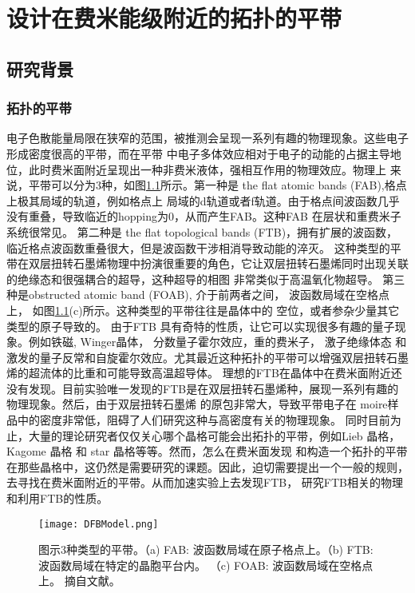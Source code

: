 \chapter{设计在费米能级附近的拓扑的平带}

\section{研究背景}

\subsection{拓扑的平带}
电子色散能量局限在狭窄的范围，被推测会呈现一系列有趣的物理现象。这些电子形成密度很高的平带，而在平带
中电子多体效应相对于电子的动能的占据主导地位，此时费米面附近呈现出一种非费米液体，强相互作用的物理效应。物理上
来说，平带可以分为3种，如图\ref{DFBModel}所示。第一种是 the flat atomic bands (FAB),格点上极其局域的轨道，例如格点上
局域的d轨道或者f轨道。由于格点间波函数几乎没有重叠，导致临近的hopping为0，从而产生FAB。这种FAB 在层状和重费米子系统很常见。
第二种是 the flat topological bands (FTB)，拥有扩展的波函数，临近格点波函数重叠很大，但是波函数干涉相消导致动能的淬灭。
这种类型的平带在双层扭转石墨烯物理中扮演很重要的角色，它让双层扭转石墨烯同时出现关联的绝缘态和很强耦合的超导，这种超导的相图
非常类似于高温氧化物超导。
第三种是obstructed atomic band (FOAB), 介于前两者之间， 波函数局域在空格点上， 如图\ref{DFBModel}(c)所示。这种类型的平带往往是晶体中的
空位，或者参杂少量其它类型的原子导致的。
由于FTB 具有奇特的性质，让它可以实现很多有趣的量子现象。例如铁磁, Winger晶体， 分数量子霍尔效应，重的费米子， 激子绝缘体态
和激发的量子反常和自旋霍尔效应。尤其最近这种拓扑的平带可以增强双层扭转石墨烯的超流体的比重和可能导致高温超导体。
理想的FTB在晶体中在费米面附近还没有发现。目前实验唯一发现的FTB是在双层扭转石墨烯种，展现一系列有趣的物理现象。然后，由于双层扭转石墨烯
的原包非常大，导致平带电子在 moire样品中的密度非常低，阻碍了人们研究这种与高密度有关的物理现象。
同时目前为止，大量的理论研究者仅仅关心哪个晶格可能会出拓扑的平带，例如Lieb 晶格， Kagome 晶格 和 star 晶格等等。然而，怎么在费米面发现
和构造一个拓扑的平带在那些晶格中，这仍然是需要研究的课题。因此，迫切需要提出一个一般的规则，去寻找在费米面附近的平带。从而加速实验上去发现FTB，
研究FTB相关的物理和利用FTB的性质。

\begin{figure}[htb]
    \centering
    \texttt{[image: DFBModel.png]}
    \caption{图示3种类型的平带。（a) FAB: 波函数局域在原子格点上。（b) FTB: 波函数局域在特定的晶胞平台内。 （c) FOAB: 波函数局域在空格点上。
    摘自文献。}
    \label{DFBModel}
    \note{}
\end{figure}

